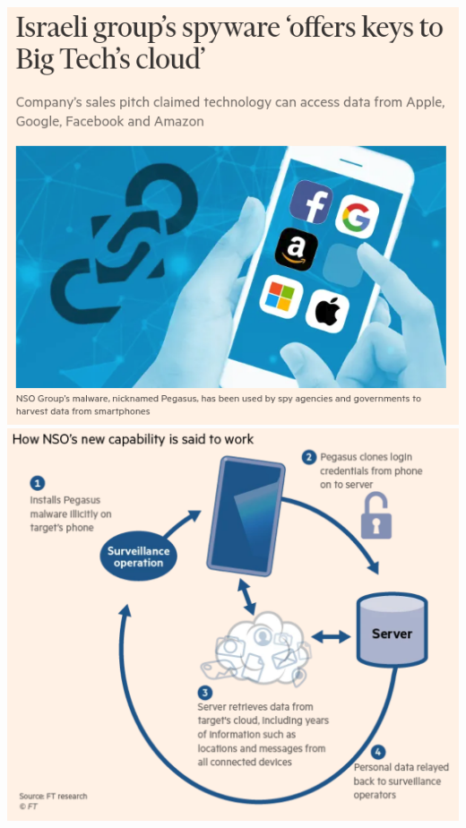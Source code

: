 \documentclass[nobackground,dvipsnames,table,aspectratio=169]{beamer}
\begin{document}
\begin{frame}{}
    \begin{columns}
            \includegraphics[width=\textwidth]{nso-article}
            \includegraphics[width=\textwidth]{nso-pegasus-diagram}
    \end{columns}
\end{frame}
\end{document}
